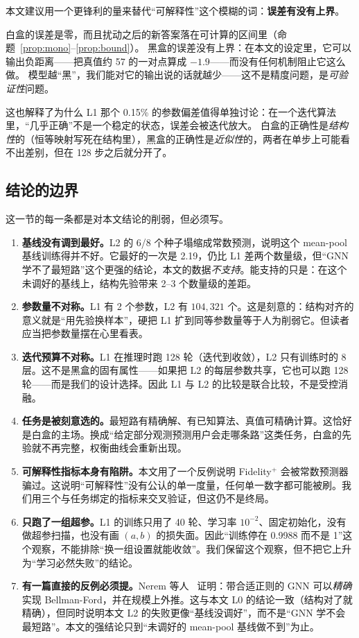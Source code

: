 本文建议用一个更锋利的量来替代“可解释性”这个模糊的词：\textbf{误差有没有上界}。

白盒的误差是零，而且扰动之后的新答案落在可计算的区间里（命题~\ref{prop:mono}--\ref{prop:bound}）。
黑盒的误差没有上界：在本文的设定里，它可以输出负距离——把真值约 57 的一对点算成 $-1.9$——而没有任何机制阻止它这么做。
模型越“黑”，我们能对它的输出说的话就越少——这不是精度问题，是\emph{可验证性}问题。

这也解释了为什么 L1 那个 0.15\% 的参数偏差值得单独讨论：在一个迭代算法里，“几乎正确”不是一个稳定的状态，误差会被迭代放大。
白盒的正确性是\emph{结构性}的（恒等映射写死在结构里），黑盒的正确性是\emph{近似性}的，两者在单步上可能看不出差别，但在 128 步之后就分开了。

\subsection{结论的边界}\label{sec:limits}

这一节的每一条都是对本文结论的削弱，但必须写。

\begin{enumerate}[leftmargin=1.8em]
\item \textbf{基线没有调到最好。}L2 的 6/8 个种子塌缩成常数预测，说明这个 mean-pool 基线训练得并不好。它最好的一次是 2.19，仍比 L1 差两个数量级，但“GNN 学不了最短路”这个更强的结论，本文的数据\emph{不支持}。能支持的只是：在这个未调好的基线上，结构先验带来 2--3 个数量级的差距。
\item \textbf{参数量不对称。}L1 有 2 个参数，L2 有 $104{,}321$ 个。这是刻意的：结构对齐的意义就是“用先验换样本”，硬把 L1 扩到同等参数量等于人为削弱它。但读者应当把参数量摆在心里看表。
\item \textbf{迭代预算不对称。}L1 在推理时跑 128 轮（迭代到收敛），L2 只有训练时的 8 层。这不是黑盒的固有属性——如果把 L2 的每层参数共享，它也可以跑 128 轮——而是我们的设计选择。因此 L1 与 L2 的比较是联合比较，不是受控消融。
\item \textbf{任务是被刻意选的。}最短路有精确解、有已知算法、真值可精确计算。这恰好是白盒的主场。换成“给定部分观测预测用户会走哪条路”这类任务，白盒的先验就不再完整，权衡曲线会重新出现。
\item \textbf{可解释性指标本身有陷阱。}本文用了一个反例说明 Fidelity$^+$ 会被常数预测器骗过。这说明“可解释性”没有公认的单一度量，任何单一数字都可能被刷。我们用三个与任务绑定的指标来交叉验证，但这仍不是终局。
\item \textbf{只跑了一组超参。}L1 的训练只用了 40 轮、学习率 $10^{-2}$、固定初始化，没有做超参扫描，也没有画 $(a,b)$ 的损失面。因此“训练停在 0.9988 而不是 1”这个观察，不能排除“换一组设置就能收敛”。我们保留这个观察，但不把它上升为“学习必然失败”的结论。
\item \textbf{有一篇直接的反例必须提。}Nerem 等人~\cite{nerem2025ood} 证明：带合适正则的 GNN 可以\emph{精确}实现 Bellman-Ford，并在规模上外推。这与本文 L0 的结论一致（结构对了就精确），但同时说明本文 L2 的失败更像“基线没调好”，而不是“GNN 学不会最短路”。本文的强结论只到“未调好的 mean-pool 基线做不到”为止。
\end{enumerate}

